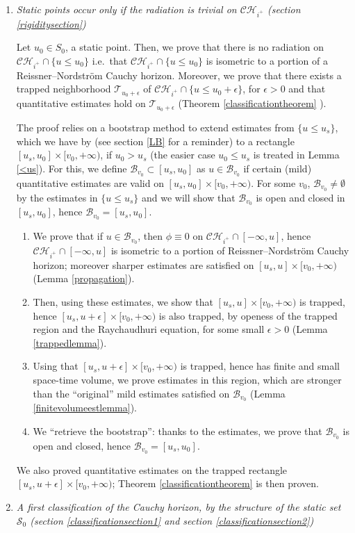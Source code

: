 \documentclass[10pt,a4paper]{article}
\theoremstyle{plain}
\theoremstyle{remark}
\theoremstyle{definition}
\theoremstyle{plain}
\theoremstyle{remark}
\theoremstyle{definition}
\newcommand{\CH}{\mathcal{CH}_{i^+}}
\numberwithin{equation}{section}
\begin{document}
\begin{enumerate}
	\item \textit{Static points occur only if the radiation is trivial on $\CH$ (section \ref{rigiditysection})} \label{stepstatic}
	
	Let $u_0 \in S_0$, a static point. Then, we prove that there is no radiation on $\CH \cap \{ u\leq u_0\}$ i.e.\ that $\CH \cap \{ u\leq u_0\}$ is isometric to a portion of a Reissner--Nordstr\"{o}m Cauchy horizon. Moreover, we prove that there exists a trapped neighborhood $\mathcal{T}_{u_0+\epsilon}$ of $\CH \cap \{ u\leq u_0+\epsilon\}$, for $\epsilon>0$ and that quantitative estimates hold on $\mathcal{T}_{u_0+\epsilon}$ (Theorem \ref{classificationtheorem} ).
	
	The proof relies on a bootstrap method to extend estimates from $ \{ u \leq u_s\}$, which we have by \cite{Moi} (see section \ref{LB} for a reminder) to a rectangle $[u_s,u_0] \times [v_0,+\infty)$, if $u_0>u_s$ (the easier case $u_0 \leq u_s$ is treated in Lemma \ref{<us}). For this, we define $\mathcal{B}_{v_0} \subset [u_s,u_0]$ as $u \in \mathcal{B}_{v_0}$ if certain (mild) quantitative estimates are valid on $[u_s,u_0] \times [v_0,+\infty)$. For some $v_0$,  $\mathcal{B}_{v_0} \neq \emptyset$ by the estimates in $ \{ u \leq u_s\}$ and we will show that $\mathcal{B}_{v_0}$ is open and closed in $[u_s,u_0]$, hence $\mathcal{B}_{v_0}=[u_s,u_0]$. \begin{enumerate}
		\item We prove that if $u \in \mathcal{B}_{v_0}$, then $\phi \equiv 0$ on $\CH \cap [-\infty,u]$, hence $\CH \cap [-\infty,u]$ is isometric to a portion of Reissner--Nordstr\"{o}m Cauchy horizon; moreover sharper estimates are satisfied on $[u_s,u] \times [v_0,+\infty)$ (Lemma \ref{propagation}).
		\item Then, using these estimates, we show that $[u_s,u] \times [v_0,+\infty)$ is trapped, hence $[u_s,u+\epsilon] \times [v_0,+\infty)$ is also trapped, by openess of the trapped region and the Raychaudhuri equation, for some small $\epsilon>0$ (Lemma \ref{trappedlemma}).
		\item Using that $[u_s,u+\epsilon] \times [v_0,+\infty)$ is trapped, hence has finite and small space-time volume, we prove estimates in this region, which are stronger than the ``original'' mild estimates satisfied on $\mathcal{B}_{v_0}$ (Lemma \ref{finitevolumeestlemma}).
		\item We ``retrieve the bootstrap'': thanks to the estimates, we prove that $\mathcal{B}_{v_0}$ is open and closed, hence $\mathcal{B}_{v_0}=[u_s,u_0]$.
	\end{enumerate}
	We also proved quantitative estimates on the trapped rectangle  $[u_s,u+\epsilon] \times [v_0,+\infty)$; Theorem \ref{classificationtheorem} is then proven.
	\item \textit{A first classification of the Cauchy horizon, by the structure of the static set $\mathcal{S}_0$ (section \ref{classificationsection1} and section \ref{classificationsection2})} \label{stepfirstclassification}
	

\end{enumerate}
\end{document}

